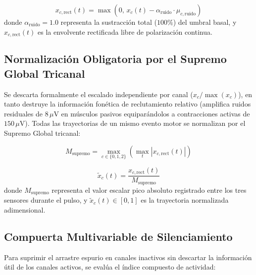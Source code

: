\documentclass[11pt,a4paper]{article}
\begin{document}
\begin{equation}
    x_{c,\text{rect}}(t) = \max\left(0,\, x_c(t) - \alpha_{\text{ruido}} \cdot \mu_{c,\text{ruido}}\right)
    \label{eq:sustraccion_ruido}
\end{equation}
donde $\alpha_{\text{ruido}} = 1.0$ representa la sustracción total ($100\%$) del umbral basal, y $x_{c,\text{rect}}(t)$ es la envolvente rectificada libre de polarización continua.

\subsection{Normalización Obligatoria por el Supremo Global Tricanal}
\label{subsec:supremo_global}

Se descarta formalmente el escalado independiente por canal ($x_c / \max(x_c)$), en tanto destruye la información fonética de reclutamiento relativo (amplifica ruidos residuales de $8\,\mu\text{V}$ en músculos pasivos equiparándolos a contracciones activas de $150\,\mu\text{V}$). Todas las trayectorias de un mismo evento motor se normalizan por el Supremo Global tricanal:

\begin{equation}
    M_{\text{supremo}} = \max_{c \in \{0, 1, 2\}} \left( \max_t |x_{c,\text{rect}}(t)| \right)
    \label{eq:supremo_global}
\end{equation}

\begin{equation}
    \tilde{x}_c(t) = \frac{x_{c,\text{rect}}(t)}{M_{\text{supremo}}}
    \label{eq:senial_normalizada}
\end{equation}
donde $M_{\text{supremo}}$ representa el valor escalar pico absoluto registrado entre los tres sensores durante el pulso, y $\tilde{x}_c(t) \in [0, 1]$ es la trayectoria normalizada adimensional.

\subsection{Compuerta Multivariable de Silenciamiento}
\label{subsec:compuerta_multivariable}

Para suprimir el arrastre espurio en canales inactivos sin descartar la información útil de los canales activos, se evalúa el índice compuesto de actividad:
\end{document}
